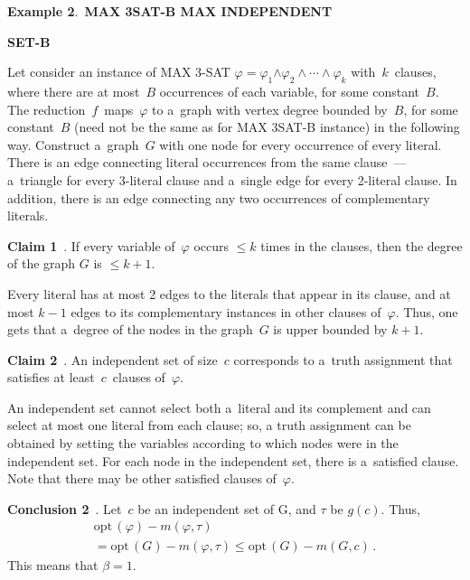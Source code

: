 \begin{multicols}{2}
\noindent
\textbf{Example 2}.\
 \textbf{MAX 3SAT-B {} MAX INDEPENDENT}

\hspace*{34pt}\textbf{SET-B}

 \smallskip

\noindent
Let consider an instance of MAX 3-SAT $\varphi = \varphi_1$\linebreak $ \wedge
\varphi_2 \wedge\cdots\wedge \varphi_k$ with~$k$~clauses, where there
are at most~$B$ occurrences of each variable, for some constant~$B$.
The reduction~$f$~maps~$\varphi$ to a~graph with vertex degree
bounded by~$B$, for some constant~$B$ (need not be the same as for
MAX 3SAT-B instance) in the following way. Construct a~graph~$G$
with one node for every occurrence of every literal. There is an
edge connecting literal occurrences from the same clause~---
a~triangle for every 3-literal clause and a~single edge for every
2-literal clause. In addition, there is an edge connecting any two
occurrences of complementary literals.

\smallskip

\noindent
\textbf{Claim 1}~\cite{MSAT3Example, P1994}.
If every variable of~$\varphi$
occurs $\leq k$ times in the clauses, then the degree of the graph $G$
is $\leq k + 1$.

\smallskip

Every literal has at most 2 edges to the literals that
appear in its clause, and at most $k-1$ edges to its complementary
instances in other clauses of~$\varphi$. Thus, one gets that a~degree
of the nodes in the graph~$G$ is upper bounded by $k+1$.

\smallskip

\noindent
\textbf{Claim 2}~\cite{MSAT3Example, P1994}.
An independent set of size~$c$
corresponds to a~truth assignment that satisfies at least~$c$~clauses of~$\varphi$.

\smallskip

An independent set cannot select both a~literal and its
complement and can select at most one literal from each clause; so,
a truth assignment can be obtained by setting the variables
according to which nodes were in the independent set. For each node
in the independent set, there is a~satisfied clause. Note that there
may be other satisfied clauses of~$\varphi$.

\smallskip

\noindent
\textbf{Conclusion 2}~\cite{MSAT3Example, P1994}. Let~$c$ be an
independent set of G, and $\tau$ be $g(c)$. Thus,
\begin{multline*}
\mathrm{opt}\,(\varphi) - m(\varphi,\tau)\\
{} =
\mathrm{opt}\,(G) - m(\varphi,\tau) \leq \mathrm{opt}\,(G) - m(G,c)\,.
\end{multline*}
This means that $\beta = 1$.


\end{multicols}
